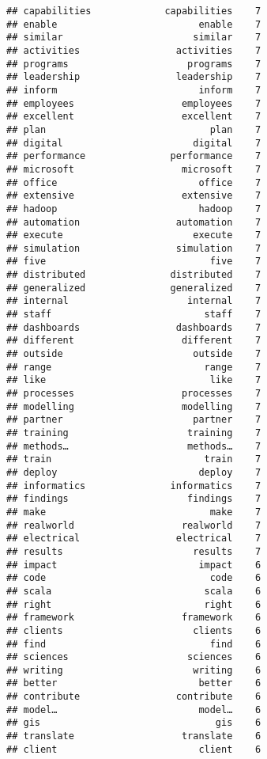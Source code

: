 \documentclass[]{article}
\begin{document}
\begin{verbatim}
## capabilities             capabilities    7
## enable                         enable    7
## similar                       similar    7
## activities                 activities    7
## programs                     programs    7
## leadership                 leadership    7
## inform                         inform    7
## employees                   employees    7
## excellent                   excellent    7
## plan                             plan    7
## digital                       digital    7
## performance               performance    7
## microsoft                   microsoft    7
## office                         office    7
## extensive                   extensive    7
## hadoop                         hadoop    7
## automation                 automation    7
## execute                       execute    7
## simulation                 simulation    7
## five                             five    7
## distributed               distributed    7
## generalized               generalized    7
## internal                     internal    7
## staff                           staff    7
## dashboards                 dashboards    7
## different                   different    7
## outside                       outside    7
## range                           range    7
## like                             like    7
## processes                   processes    7
## modelling                   modelling    7
## partner                       partner    7
## training                     training    7
## methods…                     methods…    7
## train                           train    7
## deploy                         deploy    7
## informatics               informatics    7
## findings                     findings    7
## make                             make    7
## realworld                   realworld    7
## electrical                 electrical    7
## results                       results    7
## impact                         impact    6
## code                             code    6
## scala                           scala    6
## right                           right    6
## framework                   framework    6
## clients                       clients    6
## find                             find    6
## sciences                     sciences    6
## writing                       writing    6
## better                         better    6
## contribute                 contribute    6
## model…                         model…    6
## gis                               gis    6
## translate                   translate    6
## client                         client    6

\end{verbatim}
\end{document}
